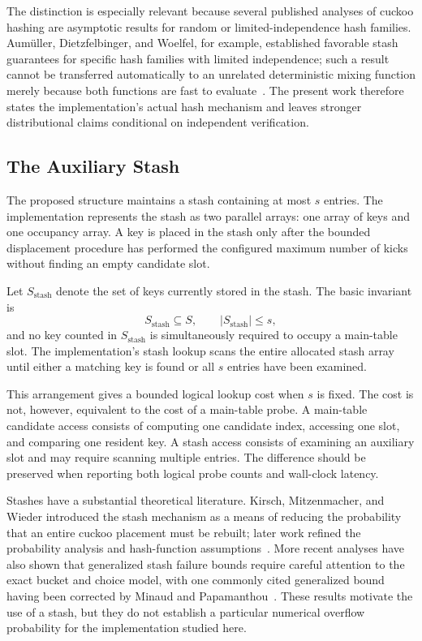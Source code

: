 \documentclass[conference]{IEEEtran}
\begin{document}
The distinction is especially relevant because several published analyses of cuckoo hashing are asymptotic results for random or limited-independence hash families. Aum\"uller, Dietzfelbinger, and Woelfel, for example, established favorable stash guarantees for specific hash families with limited independence; such a result cannot be transferred automatically to an unrelated deterministic mixing function merely because both functions are fast to evaluate~\cite{aumuller2014explicit}. The present work therefore states the implementation's actual hash mechanism and leaves stronger distributional claims conditional on independent verification.

\subsection{The Auxiliary Stash}

The proposed structure maintains a stash containing at most $s$ entries. The implementation represents the stash as two parallel arrays: one array of keys and one occupancy array. A key is placed in the stash only after the bounded displacement procedure has performed the configured maximum number of kicks without finding an empty candidate slot.

Let $S_{\mathrm{stash}}$ denote the set of keys currently stored in the stash. The basic invariant is
\begin{equation}
    S_{\mathrm{stash}}\subseteq S,
    \qquad |S_{\mathrm{stash}}|\le s,
    \label{eq:stash-invariant}
\end{equation}
and no key counted in $S_{\mathrm{stash}}$ is simultaneously required to occupy a main-table slot. The implementation's stash lookup scans the entire allocated stash array until either a matching key is found or all $s$ entries have been examined.

This arrangement gives a bounded logical lookup cost when $s$ is fixed. The cost is not, however, equivalent to the cost of a main-table probe. A main-table candidate access consists of computing one candidate index, accessing one slot, and comparing one resident key. A stash access consists of examining an auxiliary slot and may require scanning multiple entries. The difference should be preserved when reporting both logical probe counts and wall-clock latency.

Stashes have a substantial theoretical literature. Kirsch, Mitzenmacher, and Wieder introduced the stash mechanism as a means of reducing the probability that an entire cuckoo placement must be rebuilt; later work refined the probability analysis and hash-function assumptions~\cite{kirsch2009stash,aumuller2014explicit}. More recent analyses have also shown that generalized stash failure bounds require careful attention to the exact bucket and choice model, with one commonly cited generalized bound having been corrected by Minaud and Papamanthou~\cite{minaud2023generalized}. These results motivate the use of a stash, but they do not establish a particular numerical overflow probability for the implementation studied here.
\end{document}

